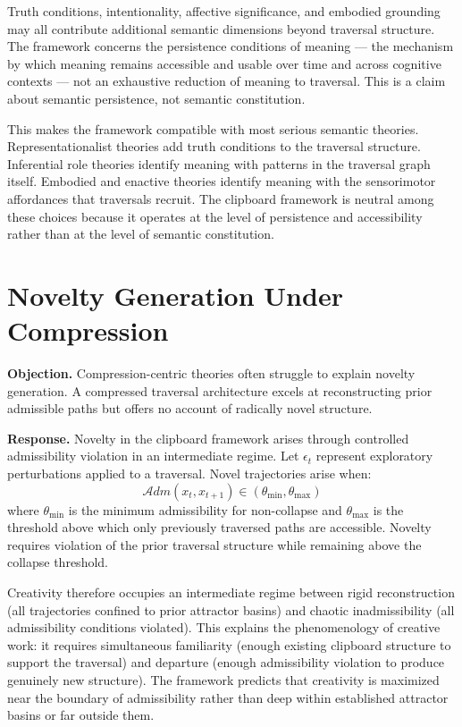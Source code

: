 \documentclass[12pt,oneside]{book}
\theoremstyle{plain}
\theoremstyle{definition}
\theoremstyle{plain}
\begin{document}
Truth conditions, intentionality, affective significance, and embodied grounding may all contribute additional semantic dimensions beyond traversal structure. The framework concerns the persistence conditions of meaning — the mechanism by which meaning remains accessible and usable over time and across cognitive contexts — not an exhaustive reduction of meaning to traversal. This is a claim about semantic persistence, not semantic constitution.

This makes the framework compatible with most serious semantic theories. Representationalist theories add truth conditions to the traversal structure. Inferential role theories identify meaning with patterns in the traversal graph itself. Embodied and enactive theories identify meaning with the sensorimotor affordances that traversals recruit. The clipboard framework is neutral among these choices because it operates at the level of persistence and accessibility rather than at the level of semantic constitution.

\section{Novelty Generation Under Compression}

\textbf{Objection.} Compression-centric theories often struggle to explain novelty generation. A compressed traversal architecture excels at reconstructing prior admissible paths but offers no account of radically novel structure.

\textbf{Response.} Novelty in the clipboard framework arises through controlled admissibility violation in an intermediate regime. Let $\epsilon_t$ represent exploratory perturbations applied to a traversal. Novel trajectories arise when:
\[
\mathcal{A}dm(x_t, x_{t+1}) \in (\theta_{\text{min}}, \theta_{\text{max}})
\]
where $\theta_{\text{min}}$ is the minimum admissibility for non-collapse and $\theta_{\text{max}}$ is the threshold above which only previously traversed paths are accessible. Novelty requires violation of the prior traversal structure while remaining above the collapse threshold.

Creativity therefore occupies an intermediate regime between rigid reconstruction (all trajectories confined to prior attractor basins) and chaotic inadmissibility (all admissibility conditions violated). This explains the phenomenology of creative work: it requires simultaneous familiarity (enough existing clipboard structure to support the traversal) and departure (enough admissibility violation to produce genuinely new structure). The framework predicts that creativity is maximized near the boundary of admissibility rather than deep within established attractor basins or far outside them.
\end{document}
